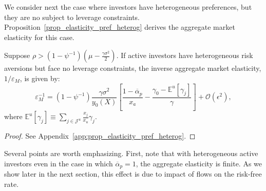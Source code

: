 We consider next the case where investors have heterogeneous preferences, but they are no subject to leverage constraints. 
Proposition~\ref{prop_elasticity_pref_heterog} derives the aggregate market elasticity for this case.
\begin{prop}\label{prop_elasticity_pref_heterog}
	Suppose $\rho>\left(1-\psi^{-1}\right)\left( \mu - \frac{\gamma\sigma^2}{2}  \right)$. If active investors have heterogeneous risk aversions but face no leverage constraints, the inverse aggregate market elasticity, $ 1/\varepsilon_M $, is given by:
	\begin{equation}\label{eq:elasticity_pref_heterog}
	\varepsilon_M^{-1}=\left(1-\psi^{-1}\right) \frac{\gamma \sigma^{2}}{y_{0}(X)}\left[\frac{1-\overline{\alpha}_{p}}{x_{a}}-\frac{\gamma_{0}-\mathbb{E}^{u}[\gamma_{j}]}{\gamma}\right]+\mathcal{O}\left(\epsilon^{2}\right),
	\end{equation}
	where $ \mathbb{E}^u[ \gamma_j] \equiv\sum_{j\in\mathcal{J}^u} \frac{x_j}{x_u} \gamma_j.$
\end{prop}
\begin{proof}
	See Appendix~\ref{app:prop_elasticity_pref_heterog}.
\end{proof}

Several points are worth emphasizing. First, note that with heterogeneous active investors even in the case in which $ \overline{\alpha}_p=1 $, the aggregate elasticity is finite. As we show later in the next section, this effect is due to impact of flows on the risk-free rate. %

